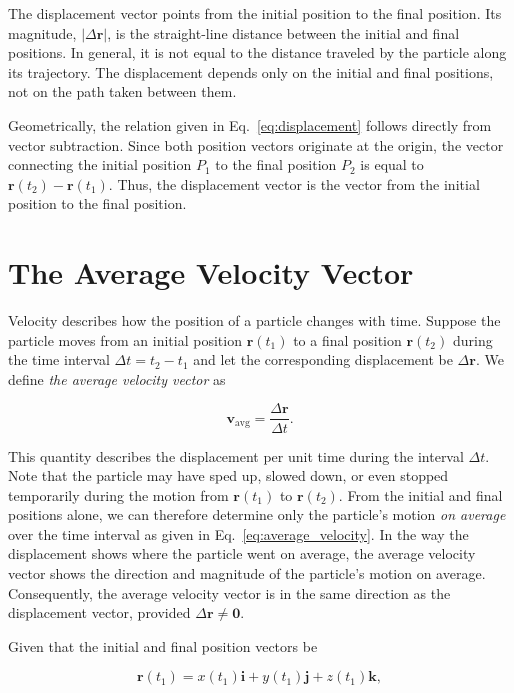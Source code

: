 \documentclass[../main.tex]{subfiles}
\theoremstyle{remark}
\begin{document}
The displacement vector points from the initial position to the final position. Its magnitude, $\lvert\Delta\mathbf{r}\rvert$, is the straight-line distance between the initial and final positions. In general, it is not equal to the distance traveled by the particle along its trajectory. The displacement depends only on the initial and final positions, not on the path taken between them.

Geometrically, the relation given in Eq.~\eqref{eq:displacement} follows directly from vector subtraction. Since both position vectors originate at the origin, the vector connecting the initial position $P_1$ to the final position $P_2$ is equal to $\mathbf{r}(t_2)-\mathbf{r}(t_1)$. Thus, the displacement vector is the vector from the initial position to the final position.

\section{\label{sec:average_velocity}The Average Velocity Vector}


Velocity describes how the position of a particle changes with time. Suppose the particle moves from an initial position $\mathbf{r}(t_1)$ to a final position $\mathbf{r}(t_2)$ during the time interval $\Delta t = t_2-t_1$ and let the corresponding displacement be $\Delta\mathbf{r}$. We define \emph{the average velocity vector} as

\begin{equation}
\mathbf{v}_{\mathrm{avg}} = \frac{\Delta\mathbf{r}}{\Delta t}.
\label{eq:average_velocity}
\end{equation}

This quantity describes the displacement per unit time during the interval $\Delta t$. Note that the particle may have sped up, slowed down, or even stopped temporarily during the motion from $\mathbf{r}(t_1)$ to $\mathbf{r}(t_2)$. From the initial and final positions alone, we can therefore determine only the particle's motion \emph{on average} over the time interval as given in Eq.~\eqref{eq:average_velocity}. In the way the displacement shows where the particle went on average, the average velocity vector shows the direction and magnitude of the particle's motion on average. Consequently, the average velocity vector is in the same direction as the displacement vector, provided $\Delta\mathbf{r} \neq \mathbf{0}$.

Given that the initial and final position vectors be

\begin{equation}
\mathbf{r}(t_1)
=
x(t_1)\mathbf{i}
+
y(t_1)\mathbf{j}
+
z(t_1)\mathbf{k},
\end{equation}
\end{document}
